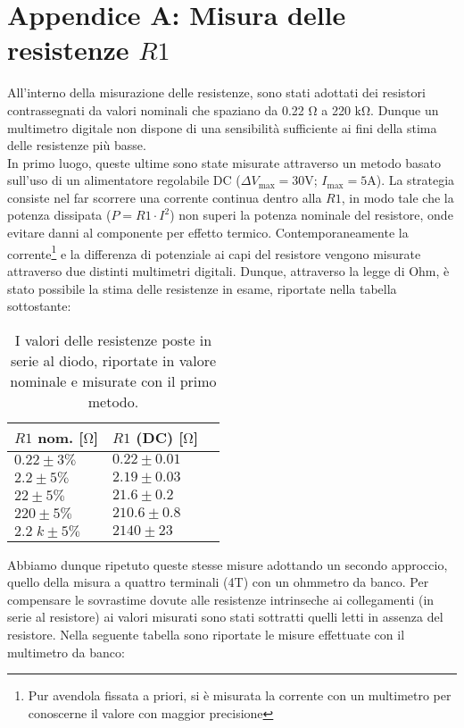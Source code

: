 \documentclass{article}[a4paper, oneside, 11pt]
\begin{document}
\section{Appendice A: Misura delle resistenze $R1$}\label{app: A}

All’interno della misurazione delle resistenze, sono stati adottati dei
resistori contrassegnati da valori nominali che spaziano da 0.22 $\si{\ohm}$
a 220 $\si{\kohm}$. Dunque un multimetro digitale non dispone di una sensibilit\`a
sufficiente ai fini della stima delle resistenze pi\`u basse.\\  
In primo luogo, queste ultime sono state misurate attraverso un metodo basato
sull'uso di un alimentatore regolabile DC ($\Delta V_{\text{max}} = 30
\si{\V}$; $I_{\text{max}} = 5 \si{\A}$). La strategia consiste nel far
scorrere una corrente continua dentro alla $R1$, in modo tale che la potenza
dissipata ($P = R1 \cdot I^2$) non superi la potenza nominale del resistore,
onde evitare danni al componente per effetto termico.
Contemporaneamente la corrente\footnote{Pur avendola fissata a priori, si \`e 
misurata la corrente con un multimetro per conoscerne il valore con maggior
precisione} e la differenza di potenziale ai capi del resistore vengono misurate
attraverso due distinti multimetri digitali. 
Dunque, attraverso la legge di Ohm, \`e stato possibile la stima delle resistenze
in esame, riportate nella tabella sottostante: 

\begin{table}[H]
	\begin{center}
		\begin{tabular}{lll}
		\toprule
		$R1$ nom. [$\si{\ohm}$] & $R1$ (DC) [$\si{\ohm}$] \\
		\midrule
		\midrule
		$0.22 \pm 3 \% $     & $0.22 \pm 0.01 $ \\
		$2.2 \pm 5 \% $     & $2.19 \pm 0.03 $ \\
		$22 \pm 5 \% $     & $21.6 \pm 0.2 $ \\
		$220 \pm 5 \% $     & $210.6 \pm 0.8 $ \\
		$2.2\; \si{k} \pm 5 \% $ & $2140 \pm 23$ \\
		\bottomrule
    	\end{tabular}
    \caption{I valori delle resistenze poste in serie al diodo, riportate in
        	valore nominale e misurate con il primo metodo. \label{tab: res_DC}}
	\end{center}
\end{table}

Abbiamo dunque ripetuto queste stesse misure adottando un secondo approccio,
quello della misura a quattro terminali (4T) con un ohmmetro da banco.
Per compensare le sovrastime dovute alle resistenze intrinseche ai
collegamenti (in serie al resistore) ai valori misurati sono stati sottratti
quelli letti in assenza del resistore.
Nella seguente tabella sono riportate le misure effettuate con il multimetro
da banco:
\end{document}
